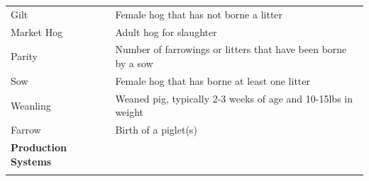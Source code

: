 \documentclass[]{book}
\theoremstyle{definition}
\theoremstyle{definition}
\theoremstyle{remark}
\begin{document}
\begin{longtable}[]{@{}ll@{}}
\begin{minipage}[t]{0.31\columnwidth}
Gilt\strut
\end{minipage} & \begin{minipage}[t]{0.24\columnwidth}\raggedright\strut
Female hog that has not borne a litter\strut
\end{minipage}\tabularnewline
\begin{minipage}[t]{0.31\columnwidth}\raggedright\strut
Market Hog\strut
\end{minipage} & \begin{minipage}[t]{0.24\columnwidth}\raggedright\strut
Adult hog for slaughter\strut
\end{minipage}\tabularnewline
\begin{minipage}[t]{0.31\columnwidth}\raggedright\strut
Parity\strut
\end{minipage} & \begin{minipage}[t]{0.24\columnwidth}\raggedright\strut
Number of farrowings or litters that have been borne by a sow\strut
\end{minipage}\tabularnewline
\begin{minipage}[t]{0.31\columnwidth}\raggedright\strut
Sow\strut
\end{minipage} & \begin{minipage}[t]{0.24\columnwidth}\raggedright\strut
Female hog that has borne at least one litter\strut
\end{minipage}\tabularnewline
\begin{minipage}[t]{0.31\columnwidth}\raggedright\strut
Weanling\strut
\end{minipage} & \begin{minipage}[t]{0.24\columnwidth}\raggedright\strut
Weaned pig, typically 2-3 weeks of age and 10-15lbs in weight\strut
\end{minipage}\tabularnewline
\begin{minipage}[t]{0.31\columnwidth}\raggedright\strut
Farrow\strut
\end{minipage} & \begin{minipage}[t]{0.24\columnwidth}\raggedright\strut
Birth of a piglet(s)\strut
\end{minipage}\tabularnewline
\begin{minipage}[t]{0.31\columnwidth}\raggedright\strut
\textbf{Production Systems}\strut
\end{minipage} & \begin{minipage}[t]{0.24\columnwidth}\raggedright\strut
\strut
\end{minipage}\tabularnewline
\begin{minipage}[t]{0.31\columnwidth}\raggedright\strut

\end{minipage}
\end{longtable}
\end{document}

